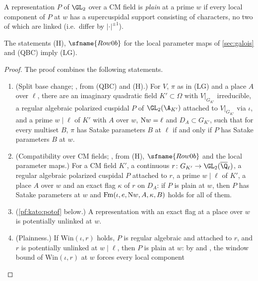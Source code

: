 A representation $P$ of $\GL_2$ over a CM field is \emph{plain} at a prime $w$ if every local component of $P$ at $w$ has
a supercuspidal support consisting of characters, no two of which are linked (i.e.\ differ by $|\cdot|^{\pm1}$).

\begin{theorem}\label{pf:kato:locq}
The statements \textup{(H)}, $\sfname{Row0b}$ for the local parameter maps of \cref{sec:galois} and \textup{(QBC)} imply
\textup{(LG)}.
\end{theorem}

\begin{proof}
The proof combines the following statements.
\begin{enumerate}[label=(\alph*)]
\item (Split base change; ,
  from \textup{(QBC)} and \textup{(H)}.) For $V$, $\pi$ as in \textup{(LG)} and a place $A$ over $\ell$, there are an
  imaginary quadratic field $K'\subset\Omega$ with $V|_{G_{K'}}$ irreducible, a regular algebraic polarized cuspidal
  $P$ of $\GL_2(\A_{K'})$ attached to $V|_{G_{K'}}$ via $\iota$, and a prime $w\mid\ell$ of $K'$ with $A$ over $w$,
  $\mathrm{N} w=\ell$ and $D_A\subset G_{K'}$, such that for every multiset $B$, $\pi$ has Satake parameters $B$ at $\ell$ if
  and only if $P$ has Satake parameters $B$ at $w$.
\item (Compatibility over CM fields;
  , from \textup{(H)},
  $\sfname{Row0b}$ and the local parameter maps.) For a CM field $K'$, a continuous $r\colon G_{K'}\to\GL_2(\katoQlb)$, a
  regular algebraic polarized cuspidal $P$ attached to $r$, a prime $w\mid\ell$ of $K'$, a place $A$ over $w$ and an exact
  flag $\kappa$ of $r$ on $D_A$: if $P$ is plain at $w$, then $P$ has Satake parameters at $w$ and
  $\mathrm{Fm}(\iota,e,\mathrm{N} w,A,\kappa,B)$ holds for all of them.
\item (\cref{pf:kato:potof} below.) A representation with an exact flag at a place over $w$ is potentially unlinked
  at $w$.
\item (Plainness.) If $\mathrm{Win}(\iota,r)$ holds, $P$ is regular algebraic and attached to $r$, and $r$ is potentially
  unlinked at $w\mid\ell$, then $P$ is plain at $w$: by  and
  , the window bound of $\mathrm{Win}(\iota,r)$ at $w$ forces every local component

\end{enumerate}
\end{proof}
